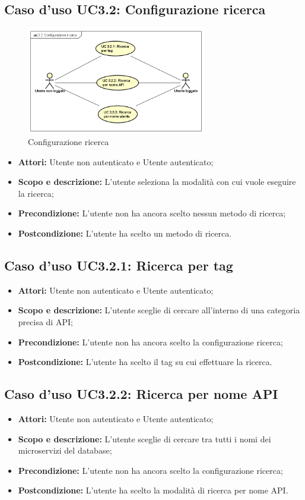 \documentclass[12pt,a4paper,titlepage]{article}
\begin{document}
	\subsection{Caso d'uso UC3.2: Configurazione ricerca}
	\label{UC3.2}
	\begin{figure}[H]
		\centering
		\includegraphics[width=0.7\textwidth]{UseCase/ConfigurazioneRicerca}
		\caption{Configurazione ricerca}
	\end{figure}
	\begin{itemize}
		\item \textbf{Attori: }Utente non autenticato e Utente autenticato;
		\item \textbf{Scopo e descrizione: }L'utente seleziona la modalità con cui vuole eseguire la ricerca;
		\item \textbf{Precondizione: }L'utente non ha ancora scelto nessun metodo di ricerca;
		\item \textbf{Postcondizione: }L'utente ha scelto un metodo di ricerca.
	\end{itemize}
	\subsection{Caso d'uso UC3.2.1: Ricerca per tag}
	\label{UC3.2.1}
	\begin{itemize}
		\item \textbf{Attori: }Utente non autenticato e Utente autenticato;
		\item \textbf{Scopo e descrizione: }L'utente sceglie di cercare all'interno di una categoria precisa di API;
		\item \textbf{Precondizione: }L'utente non ha ancora scelto la configurazione ricerca;
		\item \textbf{Postcondizione: }L'utente ha scelto il tag su cui effettuare la ricerca.
	\end{itemize}
	\subsection{Caso d'uso UC3.2.2: Ricerca per nome API}
	\label{UC3.2.2}
	\begin{itemize}
		\item \textbf{Attori: }Utente non autenticato e Utente autenticato;
		\item \textbf{Scopo e descrizione: }L'utente sceglie di cercare tra tutti i nomi dei microservizi del database;
		\item \textbf{Precondizione: }L'utente non ha ancora scelto la configurazione ricerca;
		\item \textbf{Postcondizione: }L'utente ha scelto la modalità di ricerca per nome API.
	\end{itemize}
\end{document}
